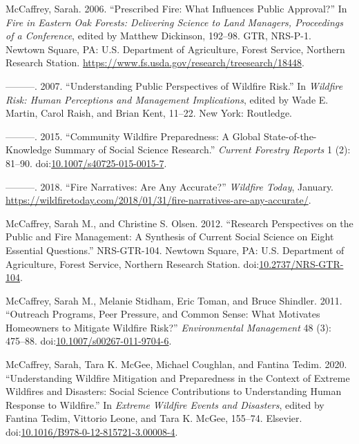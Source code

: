 \documentclass[
]{article}
\newlength{\cslhangindent}
\newenvironment{CSLReferences}[2] %
 {\begin{list}{}{%
  \setlength{\itemindent}{0pt}
  \setlength{\leftmargin}{0pt}
  \setlength{\parsep}{0pt}
  \ifodd #1
   \setlength{\leftmargin}{\cslhangindent}
   \setlength{\itemindent}{-1\cslhangindent}
  \fi
  \setlength{\itemsep}{#2\baselineskip}}}
 {\end{list}}
\begin{document}
\begin{CSLReferences}{1}{0}
McCaffrey, Sarah. 2006. {``Prescribed Fire: {What} Influences Public Approval?''} In \emph{Fire in Eastern Oak Forests: Delivering Science to Land Managers, Proceedings of a Conference}, edited by Matthew Dickinson, 192--98. {GTR}, NRS-P-1. Newtown Square, PA: U.S. Department of Agriculture, Forest Service, Northern Research Station. \url{https://www.fs.usda.gov/research/treesearch/18448}.

---------. 2007. {``Understanding {Public Perspectives} of {Wildfire Risk}.''} In \emph{Wildfire {Risk}: {Human Perceptions} and {Management Implications}}, edited by Wade E. Martin, Carol Raish, and Brian Kent, 11--22. New York: Routledge.

---------. 2015. {``Community {Wildfire Preparedness}: A {Global State-of-the-Knowledge Summary} of {Social Science Research}.''} \emph{Current Forestry Reports} 1 (2): 81--90. doi:\href{https://doi.org/10.1007/s40725-015-0015-7}{10.1007/s40725-015-0015-7}.

---------. 2018. {``Fire {Narratives}: {Are Any Accurate}?''} \emph{Wildfire Today}, January. \url{https://wildfiretoday.com/2018/01/31/fire-narratives-are-any-accurate/}.

McCaffrey, Sarah M., and Christine S. Olsen. 2012. {``Research Perspectives on the Public and Fire Management: A Synthesis of Current Social Science on Eight Essential Questions.''} NRS-GTR-104. Newtown Square, PA: U.S. Department of Agriculture, Forest Service, Northern Research Station. doi:\href{https://doi.org/10.2737/NRS-GTR-104}{10.2737/NRS-GTR-104}.

McCaffrey, Sarah M., Melanie Stidham, Eric Toman, and Bruce Shindler. 2011. {``Outreach {Programs}, {Peer Pressure}, and {Common Sense}: {What Motivates Homeowners} to {Mitigate Wildfire Risk}?''} \emph{Environmental Management} 48 (3): 475--88. doi:\href{https://doi.org/10.1007/s00267-011-9704-6}{10.1007/s00267-011-9704-6}.

McCaffrey, Sarah, Tara K. McGee, Michael Coughlan, and Fantina Tedim. 2020. {``Understanding Wildfire Mitigation and Preparedness in the Context of Extreme Wildfires and Disasters: {Social} Science Contributions to Understanding Human Response to Wildfire.''} In \emph{Extreme {Wildfire Events} and {Disasters}}, edited by Fantina Tedim, Vittorio Leone, and Tara K. McGee, 155--74. Elsevier. doi:\href{https://doi.org/10.1016/B978-0-12-815721-3.00008-4}{10.1016/B978-0-12-815721-3.00008-4}.


\end{CSLReferences}
\end{document}
